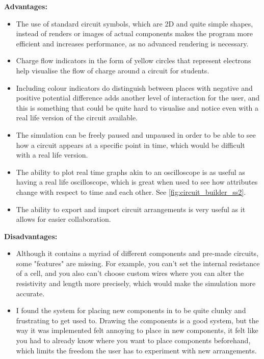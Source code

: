 \documentclass[11pt]{article}
\begin{document}
                \textbf{Advantages:}
                \begin{itemize}
                    \item The use of standard circuit symbols, which are 2D and quite simple shapes, instead of renders or images of actual components makes the program more efficient and increases performance, as no advanced rendering is necessary. 
                    \item Charge flow indicators in the form of yellow circles that represent electrons help visualise the flow of charge around a circuit for students. 
                    \item Including colour indicators do distinguish between places with negative and positive potential difference adds another level of interaction for the user, and this is something that could be quite hard to visualise and notice even with a real life version of the circuit available.
                    \item The simulation can be freely paused and unpaused in order to be able to see how a circuit appears at a specific point in time, which would be difficult with a real life version. 
                    \item The ability to plot real time graphs akin to an oscilloscope is as useful as having a real life oscilloscope, which is great when used to see how attributes change with respect to time and each other. See \autoref{fig:circuit_builder_ss2}.
                    \item The ability to export and import circuit arrangements is very useful as it allows for easier collaboration.
                \end{itemize}


                \textbf{Disadvantages:}
                \begin{itemize}
                    \item Although it contains a myriad of different components and pre-made circuits, some "features" are missing. For example, you can't set the internal resistance of a cell, and you also can't choose custom wires where you can alter the resistivity and length more precisely, which would make the simulation more accurate.
                    \item I found the system for placing new components in to be quite clunky and frustrating to get used to. Drawing the components is a good system, but the way it was implemented felt annoying to place in new components, it felt like you had to already know where you want to place components beforehand, which limits the freedom the user has to experiment with new arrangements. 
                \end{itemize}
\end{document}
